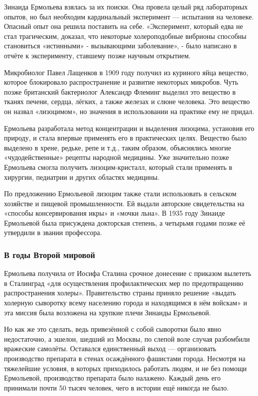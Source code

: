 Зинаида Ермольева взялась за их поиски. Она провела целый ряд лабораторных
опытов, но был необходим кардинальный эксперимент --- испытания на человеке.
Опасный опыт она решила поставить на себе. «Эксперимент, который едва не стал
трагическим, доказал, что некоторые холероподобные вибрионы способны
становиться «истинными» - вызывающими заболевание», - было написано в отчёте к
эксперименту, ставшему позже научным открытием.

Микробиолог Павел Лащенков в 1909 году получил из куриного яйца вещество,
которое блокировало распространение и развитие некоторых микробов. Чуть позже
британский бактериолог Александр Флеминг выделил это вещество в тканях печени,
сердца, лёгких, а также железах и слюне человека. Это вещество он назвал
«лизоцимом», но значения в использовании на практике ему не придал.  

Ермольева разработала метод концентрации и выделения лизоцима, установив его
природу, и стала впервые применять его в практических целях. Вещество было
выделено в хрене, редьке, репе и т.д., таким образом, объяснялись многие
«чудодейственные» рецепты народной медицины. Уже значительно позже Ермольева
смогла получить лизоцим-кристалл, который стали применять в хирургии, педиатрии
и других областях медицины.

По предложению Ермольевой лизоцим также стали использовать в сельском хозяйстве
и пищевой промышленности. Ей выдали авторские свидетельства на «способы
консервирования икры» и «мочки льна». В 1935 году Зинаиде Ермольевой была
присуждена докторская степень, а четырьмя годами позже её утвердили в звании
профессора.

\subsubsection{В годы Второй мировой}

Ермольева получила от Иосифа Сталина срочное донесение с приказом вылететь в
Сталинград «для осуществления профилактических мер по предотвращению
распространения холеры». Правительство страны приняло решение «выдать холерную
сыворотку всему населению города и находящимся в нём войскам» и эта миссия была
возложена на хрупкие плечи Зинаиды Ермольевой.

Но как же это сделать, ведь привезённой с собой сыворотки было явно
недостаточно, а эшелон, шедший из Москвы, по слепой воле случая разбомбили
вражеские самолёты. Оставался единственный выход --- организовать производство
препарата в стенах осаждённого фашистами города. Несмотря на тяжелейшие
условия, в которых приходилось работать людям, и не без помощи Ермольевой,
производство препарата было налажено. Каждый день его принимали почти 50 тысяч
человек, чего в истории ещё никогда не было.

